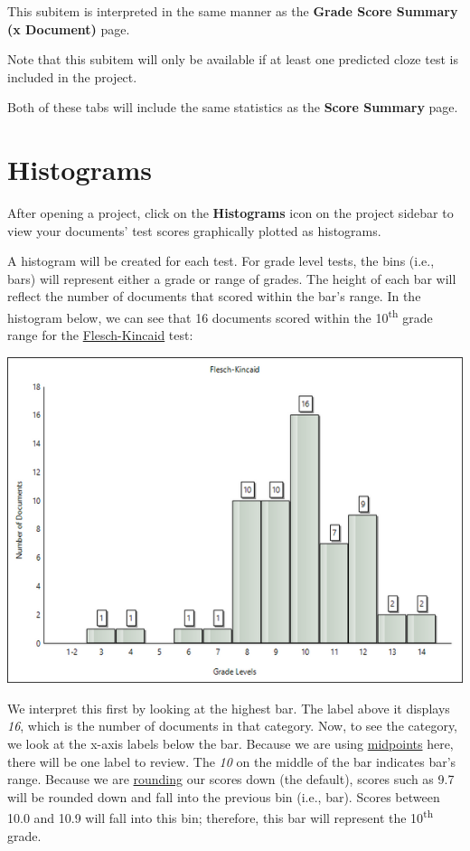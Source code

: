 \documentclass[
]{book}
\theoremstyle{definition}
\theoremstyle{definition}
\theoremstyle{definition}
\theoremstyle{definition}
\theoremstyle{remark}
\begin{document}
This subitem is interpreted in the same manner as the \textbf{Grade Score Summary (x Document)} page.

Note that this subitem will only be available if at least one predicted cloze test is included in the project.

Both of these tabs will include the same statistics as the \textbf{Score Summary} page.

\hypertarget{reviewing-batch-histograms}{%
\section{Histograms}\label{reviewing-batch-histograms}}

After opening a project, click on the \textbf{Histograms} icon on the project sidebar to view your documents' test scores graphically plotted as histograms.

A histogram will be created for each test. For grade level tests, the bins (i.e., bars) will represent either a grade or range of grades. The height of each bar will reflect the number of documents that scored within the bar's range. In the histogram below, we can see that 16 documents scored within the 10\textsuperscript{th} grade range for the \protect\hyperlink{flesch-kincaid-test}{Flesch-Kincaid} test:

\includegraphics{Images/histogrades.png}

We interpret this first by looking at the highest bar. The label above it displays \emph{16}, which is the number of documents in that category. Now, to see the category, we look at the x-axis labels below the bar. Because we are using \protect\hyperlink{options-histograms}{midpoints} here, there will be one label to review. The \emph{10} on the middle of the bar indicates bar's range. Because we are \protect\hyperlink{options-histograms}{rounding} our scores down (the default), scores such as 9.7 will be rounded down and fall into the previous bin (i.e., bar). Scores between 10.0 and 10.9 will fall into this bin; therefore, this bar will represent the 10\textsuperscript{th} grade.
\end{document}
